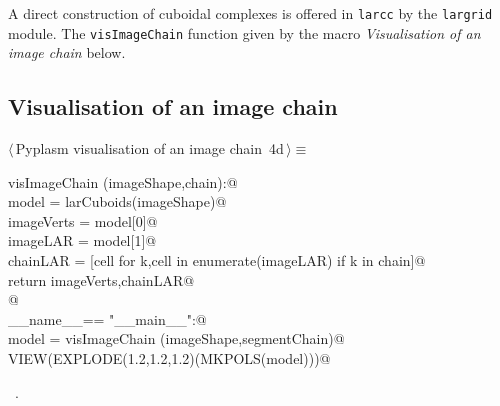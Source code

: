 \documentclass[11pt,oneside]{article}	%
\begin{document}
A direct construction of cuboidal complexes is offered in \texttt{larcc} by the \texttt{largrid} module. 
The \texttt{visImageChain} function given by the macro \emph{Visualisation of an image chain} below. 


\subsection{Visualisation of an image chain}

\begin{flushleft} \small
\begin{minipage}{\linewidth} \label{scrap8}
\protect{}$\langle\,$Pyplasm visualisation of an image chain\nobreak\ {\footnotesize 4d}$\,\rangle\equiv$
\vspace{-1ex}
\begin{list}{}{} \item
\mbox{}\verb@def visImageChain (imageShape,chain):@\\
\mbox{}\verb@   model = larCuboids(imageShape)@\\
\mbox{}\verb@   imageVerts = model[0]@\\
\mbox{}\verb@   imageLAR = model[1]@\\
\mbox{}\verb@   chainLAR = [cell for k,cell in enumerate(imageLAR) if k in chain]@\\
\mbox{}\verb@   return imageVerts,chainLAR@\\
\mbox{}\verb@   @\\
\mbox{}\verb@if __name__== "__main__":@\\
\mbox{}\verb@   model = visImageChain (imageShape,segmentChain)@\\
\mbox{}\verb@   VIEW(EXPLODE(1.2,1.2,1.2)(MKPOLS(model)))@\\
\mbox{}\verb@@{\NWsep}
\end{list}
\vspace{-1ex}
\footnotesize\addtolength{\baselineskip}{-1ex}
\begin{list}{}{\setlength{\itemsep}{-\parsep}\setlength{\itemindent}{-\leftmargin}}
\item \NWtxtMacroRefIn\ .
\end{list}
\end{minipage}\\[4ex]
\end{flushleft}
\end{document}
